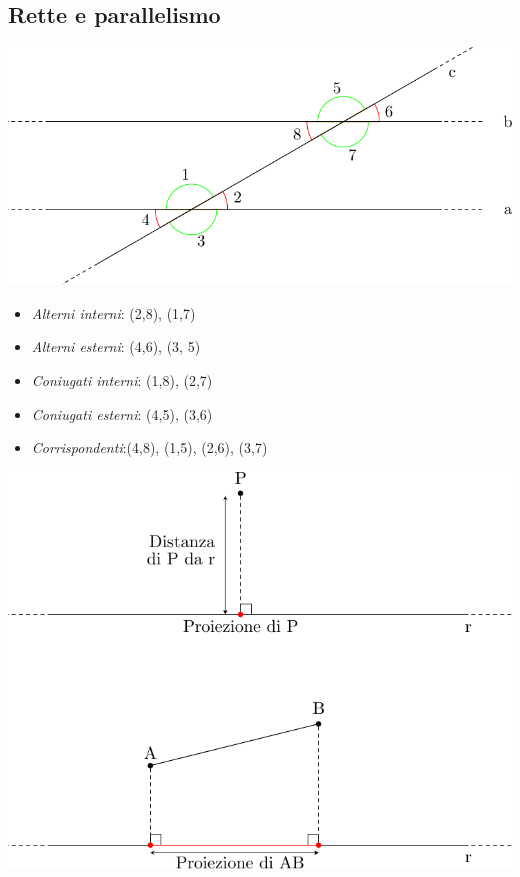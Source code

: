 \subsection{Rette e parallelismo}
\begin{center}
	\includegraphics{Images/Geometria/Rette.pdf }
\end{center}
\begin{itemize}
	\item \textit{Alterni interni}: (2,8), (1,7)
	\item \textit{Alterni esterni}: (4,6), (3, 5)
	\item \textit{Coniugati interni}: (1,8), (2,7)
	\item \textit{Coniugati esterni}: (4,5), (3,6)
	\item \textit{Corrispondenti}:(4,8), (1,5), (2,6), (3,7)
\end{itemize}
\begin{center}
	\includegraphics{Images/Geometria/Proiezioni.pdf }
\end{center}
